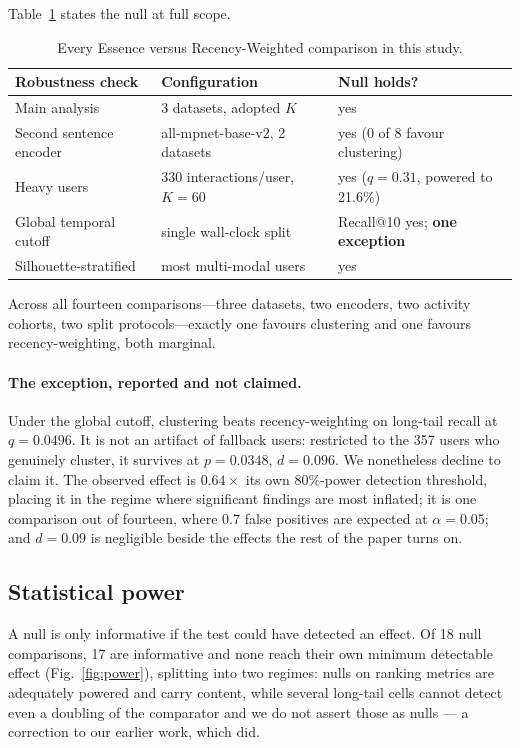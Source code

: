 \documentclass[runningheads]{llncs}
\begin{document}
Table~\ref{tab:robust} states the null at full scope.

\begin{table}[tb]
\caption{Every Essence versus Recency-Weighted comparison in this study.}\label{tab:robust}
\centering
\small
\begin{tabular}{@{}llp{4.0cm}@{}}
\toprule
Robustness check & Configuration & Null holds? \\
\midrule
Main analysis & 3 datasets, adopted $K$ & yes \\
Second sentence encoder & all-mpnet-base-v2, 2 datasets & yes (0 of 8 favour clustering) \\
Heavy users & 330 interactions/user, $K=60$ & yes ($q=0.31$, powered to 21.6\%) \\
Global temporal cutoff & single wall-clock split & Recall@10 yes; \textbf{one exception} \\
Silhouette-stratified & most multi-modal users & yes \\
\bottomrule
\end{tabular}
\end{table}

Across all fourteen comparisons---three datasets, two encoders, two activity cohorts, two
split protocols---exactly one favours clustering and one favours recency-weighting, both
marginal.

\paragraph{The exception, reported and not claimed.} Under the global cutoff, clustering
beats recency-weighting on long-tail recall at $q=0.0496$. It is not an artifact of
fallback users: restricted to the 357 users who genuinely cluster, it survives at
$p=0.0348$, $d=0.096$. We nonetheless decline to claim it. The observed effect is
$0.64\times$ its own 80\%-power detection threshold, placing it in the regime where
significant findings are most inflated; it is one comparison out of fourteen, where 0.7
false positives are expected at $\alpha=0.05$; and $d=0.09$ is negligible beside the
effects the rest of the paper turns on.

\subsection{Statistical power}\label{sec:power}

A null is only informative if the test could have detected an effect. Of 18 null
comparisons, 17 are informative and none reach their own minimum detectable effect
(Fig.~\ref{fig:power}), splitting into two regimes: nulls on ranking metrics are adequately
powered and carry content, while several long-tail cells cannot detect even a doubling of
the comparator and we do not assert those as nulls --- a correction to our earlier work,
which did.
\end{document}
